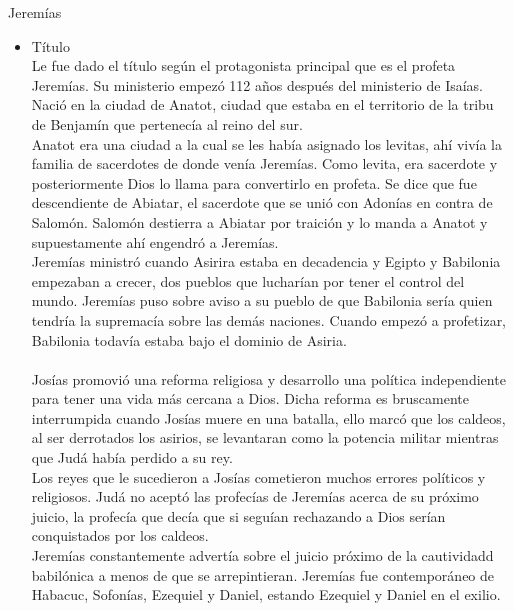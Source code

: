 %
%
\begin{section}{Jeremías}
	\begin{itemize}
		\item Título\\
			Le fue dado el título según el protagonista principal que es el profeta Jeremías. Su ministerio empezó 112 años después del ministerio de Isaías. Nació en la ciudad de Anatot, ciudad que estaba en el territorio de la tribu de Benjamín que pertenecía al reino del sur.\\
			Anatot era una ciudad a la cual se les había asignado los levitas, ahí vivía la familia de sacerdotes de donde venía Jeremías. Como levita, era sacerdote y posteriormente Dios lo llama para convertirlo en profeta. Se dice que fue descendiente de Abiatar, el sacerdote que se unió con Adonías en contra de Salomón. Salomón destierra a Abiatar por traición y lo manda a Anatot y supuestamente ahí engendró a Jeremías.\\
			Jeremías ministró cuando Asirira estaba en decadencia y Egipto y Babilonia empezaban a crecer, dos pueblos que lucharían por tener el control del mundo. Jeremías puso sobre aviso a su pueblo de que Babilonia sería quien tendría la supremacía sobre las demás naciones. Cuando empezó a profetizar, Babilonia todavía estaba bajo el dominio de Asiria.\\
			\\
			Josías promovió una reforma religiosa y desarrollo una política independiente para tener una vida más cercana a Dios. Dicha reforma es bruscamente interrumpida cuando Josías muere en una batalla, ello marcó que los caldeos, al ser derrotados los asirios, se levantaran como la potencia militar mientras que Judá había perdido a su rey.\\
			Los reyes que le sucedieron a Josías cometieron muchos errores políticos y religiosos. Judá no aceptó las profecías de Jeremías acerca de su próximo juicio, la profecía que decía que si seguían rechazando a Dios serían conquistados por los caldeos.\\
			Jeremías constantemente advertía sobre el juicio próximo de la cautividadd babilónica a menos de que se arrepintieran. Jeremías fue contemporáneo de Habacuc, Sofonías, Ezequiel y Daniel, estando Ezequiel y Daniel en el exilio. \\

\end{itemize}
\end{section}
